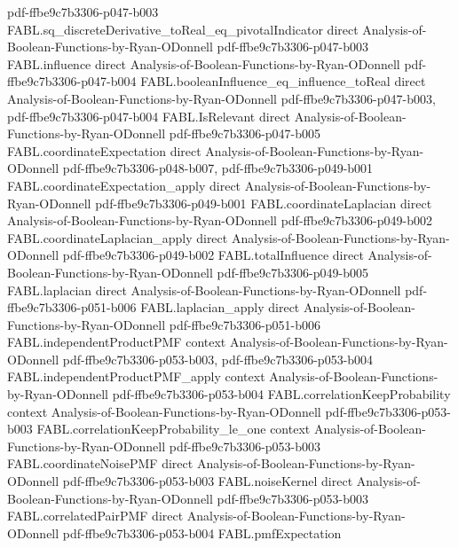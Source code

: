 \begin{theorem}
  {pdf-ffbe9c7b3306-p047-b003}
\proofstep
  {FABL.sq_discreteDerivative_toReal_eq_pivotalIndicator}
  {direct}
  {Analysis-of-Boolean-Functions-by-Ryan-ODonnell}
  {pdf-ffbe9c7b3306-p047-b003}
\proofstep
  {FABL.influence}
  {direct}
  {Analysis-of-Boolean-Functions-by-Ryan-ODonnell}
  {pdf-ffbe9c7b3306-p047-b004}
\proofstep
  {FABL.booleanInfluence_eq_influence_toReal}
  {direct}
  {Analysis-of-Boolean-Functions-by-Ryan-ODonnell}
  {pdf-ffbe9c7b3306-p047-b003,
    pdf-ffbe9c7b3306-p047-b004}
\proofstep
  {FABL.IsRelevant}
  {direct}
  {Analysis-of-Boolean-Functions-by-Ryan-ODonnell}
  {pdf-ffbe9c7b3306-p047-b005}
\proofstep
  {FABL.coordinateExpectation}
  {direct}
  {Analysis-of-Boolean-Functions-by-Ryan-ODonnell}
  {pdf-ffbe9c7b3306-p048-b007,
    pdf-ffbe9c7b3306-p049-b001}
\proofstep
  {FABL.coordinateExpectation_apply}
  {direct}
  {Analysis-of-Boolean-Functions-by-Ryan-ODonnell}
  {pdf-ffbe9c7b3306-p049-b001}
\proofstep
  {FABL.coordinateLaplacian}
  {direct}
  {Analysis-of-Boolean-Functions-by-Ryan-ODonnell}
  {pdf-ffbe9c7b3306-p049-b002}
\proofstep
  {FABL.coordinateLaplacian_apply}
  {direct}
  {Analysis-of-Boolean-Functions-by-Ryan-ODonnell}
  {pdf-ffbe9c7b3306-p049-b002}
\proofstep
  {FABL.totalInfluence}
  {direct}
  {Analysis-of-Boolean-Functions-by-Ryan-ODonnell}
  {pdf-ffbe9c7b3306-p049-b005}
\proofstep
  {FABL.laplacian}
  {direct}
  {Analysis-of-Boolean-Functions-by-Ryan-ODonnell}
  {pdf-ffbe9c7b3306-p051-b006}
\proofstep
  {FABL.laplacian_apply}
  {direct}
  {Analysis-of-Boolean-Functions-by-Ryan-ODonnell}
  {pdf-ffbe9c7b3306-p051-b006}
\proofstep
  {FABL.independentProductPMF}
  {context}
  {Analysis-of-Boolean-Functions-by-Ryan-ODonnell}
  {pdf-ffbe9c7b3306-p053-b003,
    pdf-ffbe9c7b3306-p053-b004}
\proofstep
  {FABL.independentProductPMF_apply}
  {context}
  {Analysis-of-Boolean-Functions-by-Ryan-ODonnell}
  {pdf-ffbe9c7b3306-p053-b004}
\proofstep
  {FABL.correlationKeepProbability}
  {context}
  {Analysis-of-Boolean-Functions-by-Ryan-ODonnell}
  {pdf-ffbe9c7b3306-p053-b003}
\proofstep
  {FABL.correlationKeepProbability_le_one}
  {context}
  {Analysis-of-Boolean-Functions-by-Ryan-ODonnell}
  {pdf-ffbe9c7b3306-p053-b003}
\proofstep
  {FABL.coordinateNoisePMF}
  {direct}
  {Analysis-of-Boolean-Functions-by-Ryan-ODonnell}
  {pdf-ffbe9c7b3306-p053-b003}
\proofstep
  {FABL.noiseKernel}
  {direct}
  {Analysis-of-Boolean-Functions-by-Ryan-ODonnell}
  {pdf-ffbe9c7b3306-p053-b003}
\proofstep
  {FABL.correlatedPairPMF}
  {direct}
  {Analysis-of-Boolean-Functions-by-Ryan-ODonnell}
  {pdf-ffbe9c7b3306-p053-b004}
\proofstep
  {FABL.pmfExpectation}

\end{theorem}
